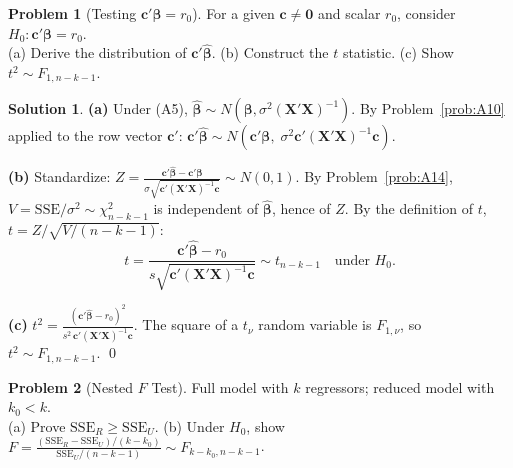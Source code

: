 \documentclass[12pt,a4paper]{article}
\theoremstyle{definition}
\newtheorem{exercise}{Problem}
\newtheorem*{solution*}{Solution}
\newcommand{\SSE}{\mathrm{SSE}}
\newcommand{\bX}{\mathbf{X}}
\def\bb{\boldsymbol{\beta}}
\def\bc{\mathbf{c}}
\newcommand{\bzero}{\mathbf{0}}
\begin{document}
\begin{exercise}[Testing $\bc'\bb = r_0$]\label{prob:B3}
For a given $\bc \neq \bzero$ and scalar $r_0$, consider $H_0\colon \bc'\bb = r_0$.\\
(a) Derive the distribution of $\bc'\hat{\bb}$. \; (b) Construct the $t$ statistic. \; (c) Show $t^2 \sim F_{1,n-k-1}$.
\end{exercise}

\begin{solution*}
\textbf{(a)} Under (A5), $\hat{\bb} \sim N(\bb, \sigma^2(\bX'\bX)^{-1})$. By Problem~\ref{prob:A10} applied to the row vector $\bc'$: $\bc'\hat{\bb} \sim N(\bc'\bb,\; \sigma^2\bc'(\bX'\bX)^{-1}\bc)$.

\textbf{(b)} Standardize: $Z = \frac{\bc'\hat{\bb} - \bc'\bb}{\sigma\sqrt{\bc'(\bX'\bX)^{-1}\bc}} \sim N(0,1)$. By Problem~\ref{prob:A14}, $V = \SSE/\sigma^2 \sim \chi^2_{n-k-1}$ is independent of $\hat{\bb}$, hence of $Z$. By the definition of $t$, $t = Z/\sqrt{V/(n-k-1)}$:
\[
t = \frac{\bc'\hat{\bb} - r_0}{s\sqrt{\bc'(\bX'\bX)^{-1}\bc}} \sim t_{n-k-1} \quad \text{under } H_0.
\]

\textbf{(c)} $t^2 = \frac{(\bc'\hat{\bb} - r_0)^2}{s^2\,\bc'(\bX'\bX)^{-1}\bc}$. The square of a $t_\nu$ random variable is $F_{1,\nu}$, so $t^2 \sim F_{1,n-k-1}$. \qed
\end{solution*}

\begin{exercise}[Nested $F$ Test]\label{prob:B4}
Full model with $k$ regressors; reduced model with $k_0 < k$.\\
(a) Prove $\SSE_R \geqslant \SSE_U$. \; (b) Under $H_0$, show $F = \frac{(\SSE_R - \SSE_U)/(k-k_0)}{\SSE_U/(n-k-1)} \sim F_{k-k_0, n-k-1}$.
\end{exercise}
\end{document}
